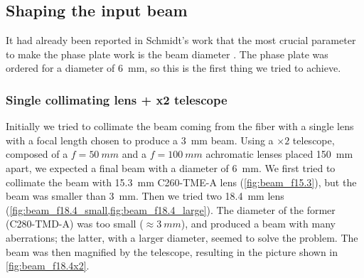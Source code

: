 \subsection{Shaping the input beam}
It had already been reported in Schmidt's work that the most crucial parameter to make the phase plate work is the beam diameter \cite{schmidt2021}. The phase plate was ordered for a diameter of \SI{6}{mm}, so this is the first thing we tried to achieve.

\subsubsection{Single collimating lens + x2 telescope}
Initially we tried to collimate the beam coming from the fiber with a single lens with a focal length chosen to produce a \SI{3}{mm} beam. Using a $\times 2$ telescope, composed of a $f=\SI{50}{mm}$ and a $f=\SI{100}{mm}$ achromatic lenses placed \SI{150}{mm} apart, we expected a final beam with a diameter of \SI{6}{mm}. We first tried to collimate the beam with \SI{15.3}{mm} C260-TME-A lens (\cref{fig:beam_f15.3}), but the beam was smaller than \SI{3}{mm}. Then we tried two \SI{18.4}{mm} lens (\cref{fig:beam_f18.4_small,fig:beam_f18.4_large}). The diameter of the former (C280-TMD-A) was too small ($\approx \SI{3}{mm}$), and produced a beam with many aberrations; the latter, with a larger diameter, seemed to solve the problem. The beam was then magnified by the telescope, resulting in the picture shown in \cref{fig:beam_f18.4x2}.

